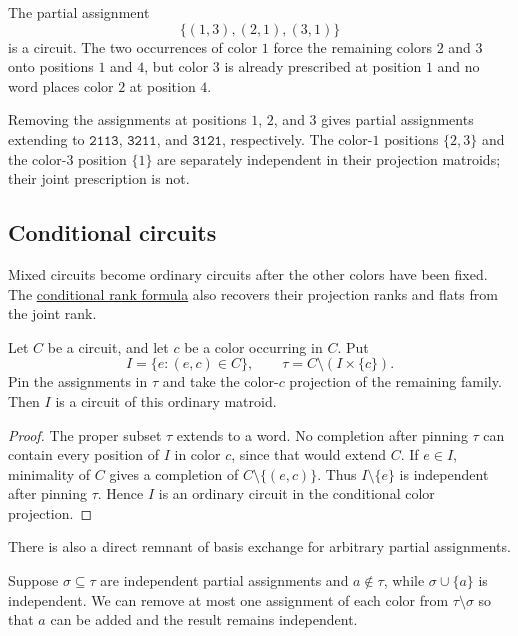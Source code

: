\begin{example}
The partial assignment
\[
 \{(1,3),(2,1),(3,1)\}
\]
is a circuit. The two occurrences of color $1$ force the remaining colors
$2$ and $3$ onto positions $1$ and $4$, but color $3$ is already prescribed
at position $1$ and no word places color $2$ at position $4$.

Removing the assignments at positions $1$, $2$, and $3$ gives partial
assignments extending to $\mathtt{2113}$, $\mathtt{3211}$, and
$\mathtt{3121}$, respectively. The color-$1$ positions $\{2,3\}$ and the
color-$3$ position $\{1\}$ are separately independent in their projection
matroids; their joint prescription is not.
\end{example}

\subsection[conditionalCircuits]{Conditional circuits}

Mixed circuits become ordinary circuits after the other colors have been
fixed. The \href{rank-flats.htm#conditionalRankFlats}{conditional rank
formula} also recovers their projection ranks and flats from the joint rank.

\begin{proposition}
Let $C$ be a circuit, and let $c$ be a color occurring in $C$. Put
\[
 I=\{e:(e,c)\in C\},
 \qquad
 \tau=C\setminus(I\times\{c\}).
\]
Pin the assignments in $\tau$ and take the color-$c$ projection of the
remaining family. Then $I$ is a circuit of this ordinary matroid.
\end{proposition}

\begin{proof}
The proper subset $\tau$ extends to a word. No completion after pinning
$\tau$ can contain every position of $I$ in color $c$, since that would
extend $C$. If $e\in I$, minimality of $C$ gives a completion of
$C\setminus\{(e,c)\}$. Thus $I\setminus\{e\}$ is independent after pinning
$\tau$. Hence $I$ is an ordinary circuit in the conditional color
projection.
\end{proof}

There is also a direct remnant of basis exchange for arbitrary partial
assignments.

\begin{proposition}
Suppose $\sigma\subseteq\tau$ are independent partial assignments and
$a\notin\tau$, while $\sigma\cup\{a\}$ is independent. We can remove at most
one assignment of each color from $\tau\setminus\sigma$ so that $a$ can be
added and the result remains independent.
\end{proposition}

